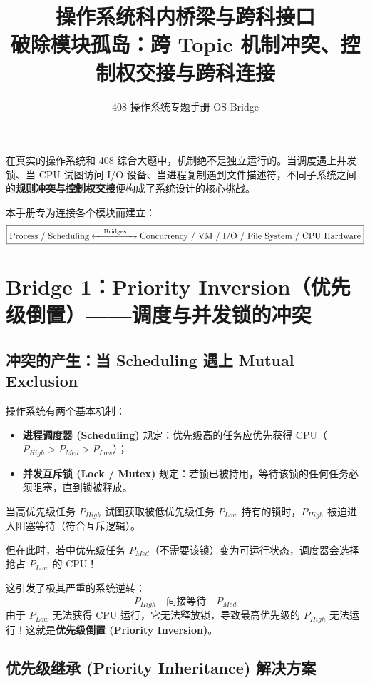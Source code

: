 \documentclass[11pt,a4paper]{ctexart}
\title{\vspace{-1.2cm}\textbf{操作系统科内桥梁与跨科接口}\\[0.4em]
\large 破除模块孤岛：跨 Topic 机制冲突、控制权交接与跨科连接}
\author{408 操作系统专题手册 OS-Bridge}
\date{}
\newcommand{\kw}[1]{\textbf{#1}}
\begin{document}
\maketitle

\begin{corebox}
在真实的操作系统和 408 综合大题中，机制绝不是独立运行的。当调度遇上并发锁、当 CPU 试图访问 I/O 设备、当进程复制遇到文件描述符，不同子系统之间的\kw{规则冲突与控制权交接}便构成了系统设计的核心挑战。

本手册专为连接各个模块而建立：
\[
\boxed{
\text{Process / Scheduling}
\xleftrightarrow{\quad\text{Bridges}\quad}
\text{Concurrency / VM / I/O / File System / CPU Hardware}
}
\]
\end{corebox}

\tableofcontents
\newpage

\section{Bridge 1：Priority Inversion（优先级倒置）——调度与并发锁的冲突}

\subsection{冲突的产生：当 Scheduling 遇上 Mutual Exclusion}

操作系统有两个基本机制：
\begin{itemize}
  \item \kw{进程调度器 (Scheduling)} 规定：优先级高的任务应优先获得 CPU（$P_{High} > P_{Med} > P_{Low}$）；
  \item \kw{并发互斥锁 (Lock / Mutex)} 规定：若锁已被持用，等待该锁的任何任务必须阻塞，直到锁被释放。
\end{itemize}

当高优先级任务 $P_{High}$ 试图获取被低优先级任务 $P_{Low}$ 持有的锁时，$P_{High}$ 被迫进入阻塞等待（符合互斥逻辑）。

但在此时，若中优先级任务 $P_{Med}$（不需要该锁）变为可运行状态，调度器会选择抢占 $P_{Low}$ 的 CPU！

这引发了极其严重的系统逆转：
\[
\boxed{
P_{High} \quad\text{间接等待}\quad P_{Med}
}
\]
由于 $P_{Low}$ 无法获得 CPU 运行，它无法释放锁，导致最高优先级的 $P_{High}$ 无法运行！这就是\kw{优先级倒置 (Priority Inversion)}。

\subsection{优先级继承 (Priority Inheritance) 解决方案}
\end{document}
